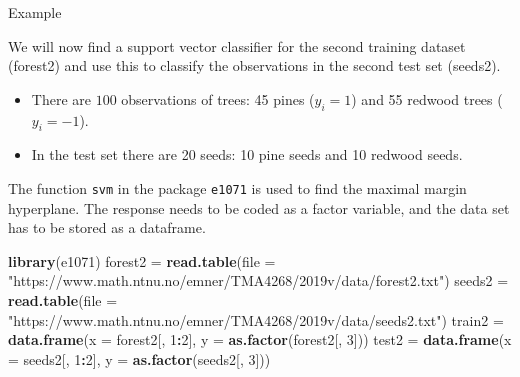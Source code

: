 \documentclass[10pt,ignorenonframetext,]{beamer}
\newenvironment{Shaded}{\begin{snugshade}}{\end{snugshade}}
\newcommand{\KeywordTok}[1]{\textcolor[rgb]{0.13,0.29,0.53}{\textbf{#1}}}
\newcommand{\DataTypeTok}[1]{\textcolor[rgb]{0.13,0.29,0.53}{#1}}
\newcommand{\DecValTok}[1]{\textcolor[rgb]{0.00,0.00,0.81}{#1}}
\newcommand{\StringTok}[1]{\textcolor[rgb]{0.31,0.60,0.02}{#1}}
\newcommand{\OperatorTok}[1]{\textcolor[rgb]{0.81,0.36,0.00}{\textbf{#1}}}
\newcommand{\NormalTok}[1]{#1}
\providecommand{\tightlist}{%
  \setlength{\itemsep}{0pt}\setlength{\parskip}{0pt}}
\begin{document}
\begin{frame}[fragile]

\begin{block}{Example}

We will now find a support vector classifier for the second training
dataset (forest2) and use this to classify the observations in the
second test set (seeds2).

\begin{itemize}
\tightlist
\item
  There are \(100\) observations of trees: 45 pines (\(y_i=1\)) and 55
  redwood trees (\(y_i=-1\)).
\item
  In the test set there are 20 seeds: 10 pine seeds and 10 redwood
  seeds.
\end{itemize}

The function \texttt{svm} in the package \texttt{e1071} is used to find
the maximal margin hyperplane. The response needs to be coded as a
factor variable, and the data set has to be stored as a dataframe.

\footnotesize

\begin{Shaded}
\begin{Highlighting}[]
\KeywordTok{library}\NormalTok{(e1071)}
\NormalTok{forest2 =}\StringTok{ }\KeywordTok{read.table}\NormalTok{(}\DataTypeTok{file =} \StringTok{"https://www.math.ntnu.no/emner/TMA4268/2019v/data/forest2.txt"}\NormalTok{)}
\NormalTok{seeds2 =}\StringTok{ }\KeywordTok{read.table}\NormalTok{(}\DataTypeTok{file =} \StringTok{"https://www.math.ntnu.no/emner/TMA4268/2019v/data/seeds2.txt"}\NormalTok{)}
\NormalTok{train2 =}\StringTok{ }\KeywordTok{data.frame}\NormalTok{(}\DataTypeTok{x =}\NormalTok{ forest2[, }\DecValTok{1}\OperatorTok{:}\DecValTok{2}\NormalTok{], }\DataTypeTok{y =} \KeywordTok{as.factor}\NormalTok{(forest2[, }\DecValTok{3}\NormalTok{]))}
\NormalTok{test2 =}\StringTok{ }\KeywordTok{data.frame}\NormalTok{(}\DataTypeTok{x =}\NormalTok{ seeds2[, }\DecValTok{1}\OperatorTok{:}\DecValTok{2}\NormalTok{], }\DataTypeTok{y =} \KeywordTok{as.factor}\NormalTok{(seeds2[, }\DecValTok{3}\NormalTok{]))}
\end{Highlighting}
\end{Shaded}

\normalsize

\end{block}

\end{frame}
\end{document}
